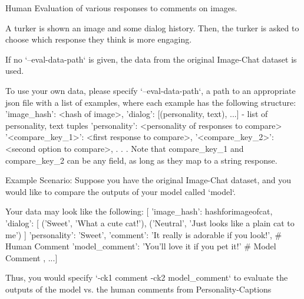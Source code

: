 \begin{DoxyVerb}Human Evaluation of various responses to comments on images.

A turker is shown an image and some dialog history. Then, the
turker is asked to choose which response they think is more engaging.

If no `--eval-data-path` is given, the data from the original
Image-Chat dataset is used.

To use your own data, please specify `--eval-data-path`, a path to an
appropriate json file with a list of examples, where each example
has the following structure:
    {
        'image_hash': <hash of image>,
        'dialog': [(personality, text), ...] - list of personality, text tuples
        'personality': <personality of responses to compare>
        '<compare_key_1>': <first response to compare>,
        '<compare_key_2>': <second option to compare>,
        .
        .
        .
    }
Note that compare_key_1 and compare_key_2 can be any field, as long as they
map to a string response.

Example Scenario:
    Suppose you have the original Image-Chat dataset, and
    you would like to compare the outputs of your model called `model`.

    Your data may look like the following:
    [{
        'image_hash': hashforimageofcat,
        'dialog': [
            ('Sweet', 'What a cute cat!'),
            ('Neutral', 'Just looks like a plain cat to me')
        ]
        'personality': 'Sweet',
        'comment': 'It really is adorable if you look!', # Human Comment
        'model_comment': 'You'll love it if you pet it!' # Model Comment
    }, ...]

    Thus, you would specify `-ck1 comment -ck2 model_comment` to evaluate
    the outputs of the model vs. the human comments from Personality-Captions
\end{DoxyVerb}


